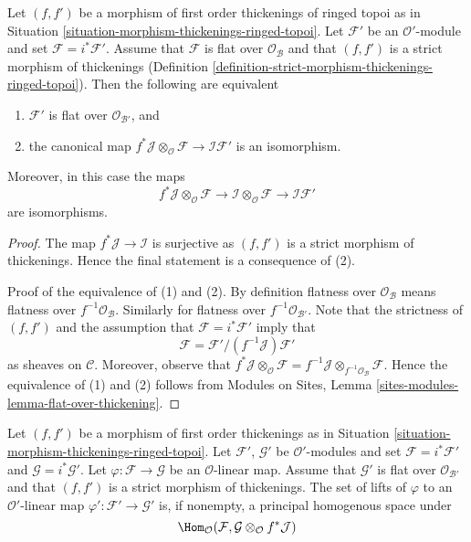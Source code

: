 \begin{lemma}
\label{lemma-deform-module-ringed-topoi}
Let $(f, f')$ be a morphism of first order thickenings of ringed topoi
as in Situation \ref{situation-morphism-thickenings-ringed-topoi}.
Let $\mathcal{F}'$ be an $\mathcal{O}'$-module
and set $\mathcal{F} = i^*\mathcal{F}'$.
Assume that $\mathcal{F}$ is flat over $\mathcal{O}_\mathcal{B}$
and that $(f, f')$ is a strict morphism of thickenings
(Definition \ref{definition-strict-morphism-thickenings-ringed-topoi}).
Then the following are equivalent
\begin{enumerate}
\item $\mathcal{F}'$ is flat over $\mathcal{O}_{\mathcal{B}'}$, and
\item the canonical map
$f^*\mathcal{J} \otimes_\mathcal{O} \mathcal{F} \to
\mathcal{I}\mathcal{F}'$
is an isomorphism.
\end{enumerate}
Moreover, in this case the maps
$$
f^*\mathcal{J} \otimes_\mathcal{O} \mathcal{F} \to
\mathcal{I} \otimes_\mathcal{O} \mathcal{F} \to
\mathcal{I}\mathcal{F}'
$$
are isomorphisms.
\end{lemma}

\begin{proof}
The map $f^*\mathcal{J} \to \mathcal{I}$ is surjective
as $(f, f')$ is a strict morphism of thickenings.
Hence the final statement is a consequence of (2).

\medskip\noindent
Proof of the equivalence of (1) and (2). By definition flatness over
$\mathcal{O}_\mathcal{B}$ means flatness over $f^{-1}\mathcal{O}_\mathcal{B}$.
Similarly for flatness over $f^{-1}\mathcal{O}_{\mathcal{B}'}$.
Note that the strictness of $(f, f')$ and the assumption that
$\mathcal{F} = i^*\mathcal{F}'$ imply that
$$
\mathcal{F} = \mathcal{F}'/(f^{-1}\mathcal{J})\mathcal{F}'
$$
as sheaves on $\mathcal{C}$. Moreover, observe that
$f^*\mathcal{J} \otimes_\mathcal{O} \mathcal{F} =
f^{-1}\mathcal{J} \otimes_{f^{-1}\mathcal{O}_\mathcal{B}} \mathcal{F}$.
Hence the equivalence of (1) and (2) follows from
Modules on Sites, Lemma \ref{sites-modules-lemma-flat-over-thickening}.
\end{proof}

\begin{lemma}
\label{lemma-inf-map-rel-ringed-topoi}
Let $(f, f')$ be a morphism of first order thickenings as in
Situation \ref{situation-morphism-thickenings-ringed-topoi}.
Let $\mathcal{F}'$, $\mathcal{G}'$ be $\mathcal{O}'$-modules and set
$\mathcal{F} = i^*\mathcal{F}'$ and $\mathcal{G} = i^*\mathcal{G}'$.
Let $\varphi : \mathcal{F} \to \mathcal{G}$ be an $\mathcal{O}$-linear map.
Assume that $\mathcal{G}'$ is flat over $\mathcal{O}_{\mathcal{B}'}$ and that
$(f, f')$ is a strict morphism of thickenings.
The set of lifts of $\varphi$ to an $\mathcal{O}'$-linear map
$\varphi' : \mathcal{F}' \to \mathcal{G}'$ is, if nonempty, a principal
homogenous space under
$$
\Hom_\mathcal{O}(\mathcal{F},
\mathcal{G} \otimes_\mathcal{O} f^*\mathcal{J})
$$
\end{lemma}

